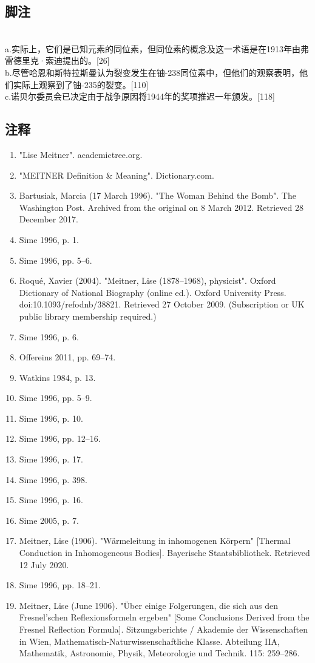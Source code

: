 \subsection{脚注}\\
a.实际上，它们是已知元素的同位素，但同位素的概念及这一术语是在1913年由弗雷德里克·索迪提出的。[26]\\
b.尽管哈恩和斯特拉斯曼认为裂变发生在铀-238同位素中，但他们的观察表明，他们实际上观察到了铀-235的裂变。[110]\\
c.诺贝尔委员会已决定由于战争原因将1944年的奖项推迟一年颁发。[118]\\
\subsection{注释}
\begin{enumerate}
\item "Lise Meitner". academictree.org.
\item "MEITNER Definition & Meaning". Dictionary.com.
\item Bartusiak, Marcia (17 March 1996). "The Woman Behind the Bomb". The Washington Post. Archived from the original on 8 March 2012. Retrieved 28 December 2017.
\item Sime 1996, p. 1.
\item Sime 1996, pp. 5–6.
\item Roqué, Xavier (2004). "Meitner, Lise (1878–1968), physicist". Oxford Dictionary of National Biography (online ed.). Oxford University Press. doi:10.1093/ref\:odnb/38821. Retrieved 27 October 2009. (Subscription or UK public library membership required.)
\item Sime 1996, p. 6.
\item Offereins 2011, pp. 69–74.
\item Watkins 1984, p. 13.
\item Sime 1996, pp. 5–9.
\item Sime 1996, p. 10.
\item Sime 1996, pp. 12–16.
\item Sime 1996, p. 17.
\item Sime 1996, p. 398.
\item Sime 1996, p. 16.
\item Sime 2005, p. 7.
\item Meitner, Lise (1906). "Wärmeleitung in inhomogenen Körpern" [Thermal Conduction in Inhomogeneous Bodies]. Bayerische Staatsbibliothek. Retrieved 12 July 2020.
\item Sime 1996, pp. 18–21.
\item Meitner, Lise (June 1906). "Über einige Folgerungen, die sich aus den Fresnel'schen Reflexionsformeln ergeben" [Some Conclusions Derived from the Fresnel Reflection Formula]. Sitzungsberichte / Akademie der Wissenschaften in Wien, Mathematisch-Naturwissenschaftliche Klasse. Abteilung IIA, Mathematik, Astronomie, Physik, Meteorologie und Technik. 115: 259–286.

\end{enumerate}
